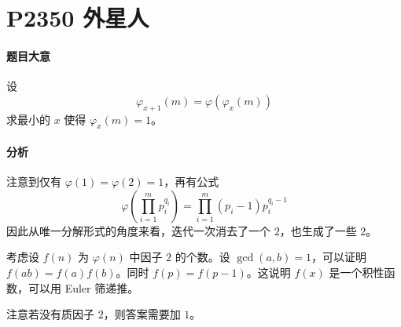 \section{P2350 外星人}

\paragraph{题目大意}

设
\[ \varphi_{x+1}(m) = \varphi(\varphi_x(m)) \]
求最小的 $x$ 使得 $\varphi_x(m) = 1$。

\paragraph{分析}

注意到仅有 $\varphi(1) = \varphi(2) = 1$，再有公式
\[ \varphi\left(\prod_{i=1}^mp_i^{q_i}\right) = \prod_{i=1}^m(p_i-1)p_i^{q_i-1} \]
因此从唯一分解形式的角度来看，迭代一次消去了一个 $2$，也生成了一些 $2$。

考虑设 $f(n)$ 为 $\varphi(n)$ 中因子 $2$ 的个数。设 $\gcd(a,b) = 1$，可以证明 $f(ab) = f(a) f(b)$。同时 $f(p) = f(p-1)$。这说明 $f(x)$ 是一个积性函数，可以用 Euler 筛递推。

注意若没有质因子 $2$，则答案需要加 $1$。